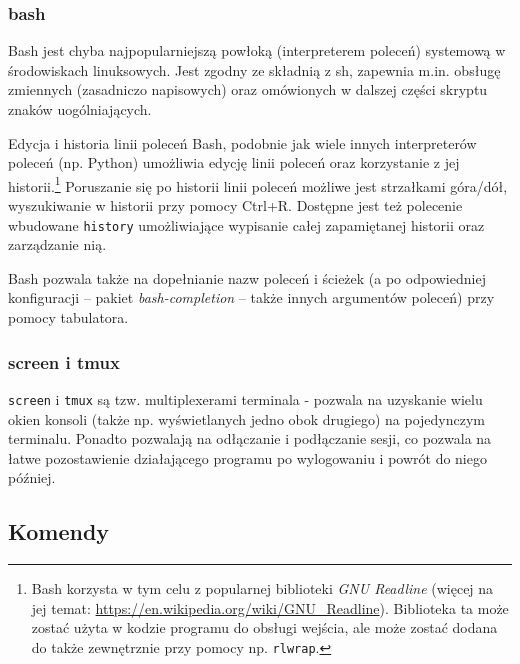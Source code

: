 \subsubsection{bash}
Bash jest chyba najpopularniejszą powłoką (interpreterem poleceń) systemową w środowiskach linuksowych.
Jest zgodny ze składnią z sh, zapewnia m.in. obsługę zmiennych (zasadniczo napisowych) oraz omówionych w dalszej części skryptu znaków uogólniających.

\begin{ProTip}[breakable]{Edycja i historia linii poleceń}
Bash, podobnie jak wiele innych interpreterów poleceń (np. Python) umożliwia edycję linii poleceń oraz korzystanie z jej historii.\footnote{
	Bash korzysta w tym celu z popularnej biblioteki \textit{GNU Readline} (więcej na jej temat: \url{https://en.wikipedia.org/wiki/GNU\_Readline}).
	Biblioteka ta może zostać użyta w kodzie programu do obsługi wejścia, ale może zostać dodana do także zewnętrznie przy pomocy np. \Verb$rlwrap$.
}
Poruszanie się po historii linii poleceń możliwe jest strzałkami góra/dół, wyszukiwanie w historii przy pomocy Ctrl+R.
Dostępne jest też polecenie wbudowane \texttt{history} umożliwiające wypisanie całej zapamiętanej historii oraz zarządzanie nią.

Bash pozwala także na dopełnianie nazw poleceń i ścieżek (a po odpowiedniej konfiguracji – pakiet \textit{bash-completion} – także innych argumentów poleceń) przy pomocy tabulatora.
\end{ProTip}

\subsubsection{screen i tmux}
\texttt{screen} i \texttt{tmux} są tzw. multiplexerami terminala - pozwala na uzyskanie wielu okien konsoli (także np. wyświetlanych jedno obok drugiego) na pojedynczym terminalu.
Ponadto pozwalają na odłączanie i podłączanie sesji, co pozwala na łatwe pozostawienie działającego programu po wylogowaniu i powrót do niego później.

\subsection{Komendy}

